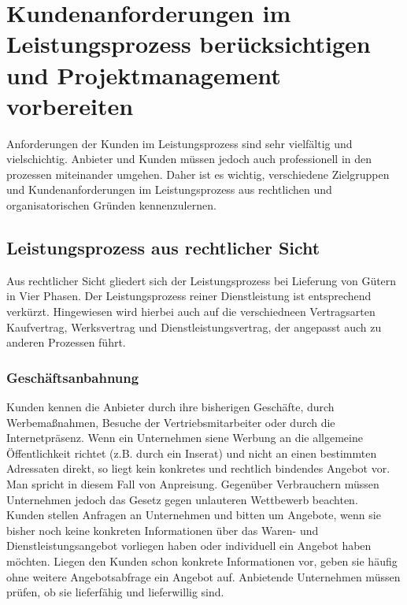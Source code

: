 \documentclass[a4paper, 12pt]{report}
\begin{document}
\newpage
\section{Kundenanforderungen im Leistungsprozess berücksichtigen und
Projektmanagement vorbereiten}

Anforderungen der Kunden im Leistungsprozess sind sehr vielfältig und
vielschichtig. Anbieter und Kunden müssen jedoch auch professionell in den
prozessen miteinander umgehen. Daher ist es wichtig, verschiedene Zielgruppen
und Kundenanforderungen im Leistungsprozess aus rechtlichen und
organisatorischen Gründen kennenzulernen.

\subsection{Leistungsprozess aus rechtlicher Sicht}

Aus rechtlicher Sicht gliedert sich der Leistungsprozess bei Lieferung von
Gütern in Vier Phasen. Der Leistungsprozess reiner Dienstleistung ist
entsprechend verkürzt. Hingewiesen wird hierbei auch auf die verschiedneen
Vertragsarten Kaufvertrag, Werksvertrag und Dienstleistungsvertrag, der
angepasst auch zu anderen Prozessen führt. \\

\subsubsection{Geschäftsanbahnung}

Kunden kennen die Anbieter durch ihre bisherigen Geschäfte, durch
Werbemaßnahmen, Besuche der Vertriebsmitarbeiter oder durch die Internetpräsenz.
Wenn ein Unternehmen siene Werbung an die allgemeine Öffentlichkeit richtet
(z.B. durch ein Inserat) und nicht an einen bestimmten Adressaten direkt, so
liegt kein konkretes und rechtlich bindendes Angebot vor. Man spricht in diesem
Fall von Anpreisung. Gegenüber Verbrauchern müssen Unternehmen jedoch das Gesetz
gegen unlauteren Wettbewerb beachten. \\

Kunden stellen Anfragen an Unternehmen und bitten um Angebote, wenn sie bisher
noch keine konkreten Informationen über das Waren- und Dienstleistungsangebot
vorliegen haben oder individuell ein Angebot haben möchten. Liegen den Kunden
schon konkrete Informationen vor, geben sie häufig ohne weitere Angebotsabfrage
ein Angebot auf. Anbietende Unternehmen müssen prüfen, ob sie lieferfähig und
lieferwillig sind.
\end{document}
